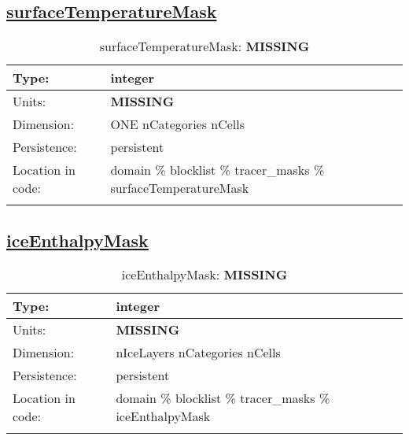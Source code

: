 \subsection[surfaceTemperatureMask]{\hyperref[sec:var_tab_tracer_masks]{surfaceTemperatureMask}}
\label{subsec:var_sec_tracer_masks_surfaceTemperatureMask}
\begin{center}
\begin{longtable}{| p{2.0in} | p{4.0in} |}
        \hline 
        Type: & integer \\
        \hline 
        Units: & {\bf \color{red} MISSING} \\
        \hline 
        Dimension: & ONE nCategories nCells \\
        \hline 
        Persistence: & persistent \\
        \hline 
         Location in code: & domain \% blocklist \% tracer\_masks \% surfaceTemperatureMask \\
         \hline 
    \caption{surfaceTemperatureMask: {\bf \color{red} MISSING}}
\end{longtable}
\end{center}
\subsection[iceEnthalpyMask]{\hyperref[sec:var_tab_tracer_masks]{iceEnthalpyMask}}
\label{subsec:var_sec_tracer_masks_iceEnthalpyMask}
\begin{center}
\begin{longtable}{| p{2.0in} | p{4.0in} |}
        \hline 
        Type: & integer \\
        \hline 
        Units: & {\bf \color{red} MISSING} \\
        \hline 
        Dimension: & nIceLayers nCategories nCells \\
        \hline 
        Persistence: & persistent \\
        \hline 
         Location in code: & domain \% blocklist \% tracer\_masks \% iceEnthalpyMask \\
         \hline 
    \caption{iceEnthalpyMask: {\bf \color{red} MISSING}}
\end{longtable}
\end{center}
